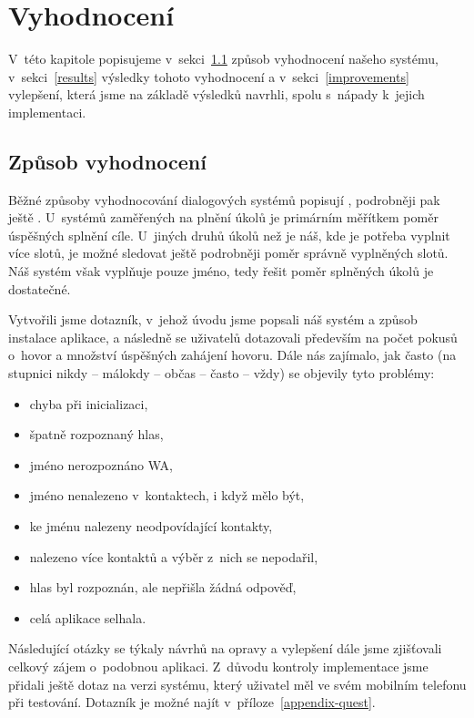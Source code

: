 \chapter{Vyhodnocení}\label{chapter-results}

V~této kapitole popisujeme v~sekci~\ref{methods} způsob vyhodnocení našeho systému,
v~sekci~\ref{results} výsledky tohoto vyhodnocení a v~sekci~\ref{improvements}
vylepšení, která jsme na základě výsledků navrhli, spolu s~nápady k~jejich implementaci.

\section{Způsob vyhodnocení}\label{methods}

Běžné způsoby vyhodnocování dialogových systémů popisují
\citet[sekce 24.5]{jurafsky_slp_2020}, podrobněji pak ještě \citet{Deriu_2020}.
U~systémů zaměřených na plnění úkolů je primárním měřítkem poměr úspěšných
splnění cíle. U~jiných druhů úkolů než je náš, kde je potřeba vyplnit více slotů, je možné
sledovat ještě podrobněji poměr správně vyplněných slotů. Náš systém však
vyplňuje pouze jméno, tedy řešit poměr splněných úkolů je dostatečné.

Vytvořili jsme dotazník, v~jehož úvodu jsme popsali náš systém a způsob instalace
aplikace, a následně se uživatelů dotazovali především na počet pokusů o~hovor a
množství úspěšných zahájení hovoru. Dále nás zajímalo, jak často (na stupnici
nikdy -- málokdy -- občas -- často -- vždy) se objevily
tyto problémy:
\begin{itemize}
    \item chyba při inicializaci,
    \item špatně rozpoznaný hlas,
    \item jméno nerozpoznáno WA,
    \item jméno nenalezeno v~kontaktech, i když mělo být,
    \item ke jménu nalezeny neodpovídající kontakty,
    \item nalezeno více kontaktů a výběr z~nich se nepodařil,
    \item hlas byl rozpoznán, ale nepřišla žádná odpověď,
    \item celá aplikace selhala.
\end{itemize}
Následující otázky se týkaly návrhů na opravy a vylepšení dále jsme zjišťovali celkový
zájem o~podobnou aplikaci. Z~důvodu kontroly implementace jsme přidali ještě
dotaz na verzi systému, který uživatel měl ve svém mobilním telefonu při testování. Dotazník je
možné najít v~příloze~\ref{appendix-quest}.

